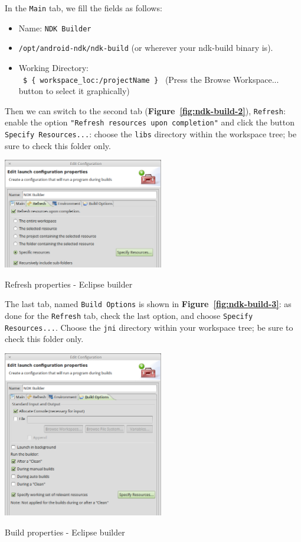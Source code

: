 \documentclass[a4paper,10pt]{article}
\makeatletter
\newenvironment{figurehere}{\def\@captype{figure}\vspace{2ex}}{\vspace{2ex}}
\newcommand{\reff}[1]{\textbf{Figure~\ref{#1}}}
\makeatother
\begin{document}
\begin{multicols}{2}
In the \texttt{Main} tab, we fill the fields as follows:
\begin{itemize}
\item Name: \texttt{NDK Builder}
\item \texttt{/opt/android-ndk/ndk-build} (or wherever your ndk-build binary is).
\item Working Directory:\\
\texttt{ \$ \{ workspace\_loc:/projectName \} } (Press the Browse Workspace... button to select it graphically)
\end{itemize}
Then we can switch to the second tab (\reff{fig:ndk-build-2}), \texttt{Refresh}: enable the option \texttt{"Refresh resources upon completion"} and click the button \texttt{Specify Resources...}: choose the \texttt{libs} directory within the workspace tree; be sure to check this folder only.

\begin{figurehere}
 \centering
 \includegraphics[width=7cm]{./figures/ndk-build-2.png}
 \caption{Refresh properties - Eclipse builder}
 \label{fig:ndk-build-2}
\end{figurehere}

The last tab, named \texttt{Build Options} is shown in \reff{fig:ndk-build-3}: as done for the \texttt{Refresh} tab, check the last option, and choose \texttt{Specify Resources...}. Choose the \texttt{jni} directory within your workspace tree; be sure to check this folder only.

\begin{figurehere}
 \centering
 \includegraphics[width=7cm]{./figures/ndk-build-3.png}
 \caption{Build properties - Eclipse builder}
 \label{fig:ndk-build-3}
\end{figurehere}


\end{multicols}
\end{document}

